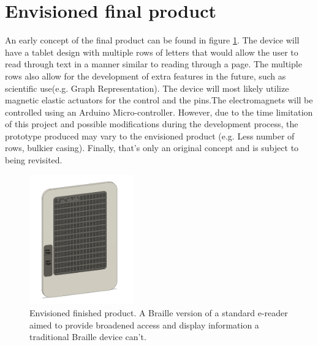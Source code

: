 \section{Envisioned final product}
An early concept of the final product can be found in figure \ref{fig:e-reader}.
The device will have a tablet design with multiple rows of letters that would allow the user to read through text in a manner similar to reading through a page.
The multiple rows also allow for the development of extra features in the future, such as scientific use(e.g. Graph Representation).
The device will most likely utilize magnetic elastic actuators for the control and the pins.The electromagnets will be controlled using an Arduino Micro-controller.
However, due to the time limitation of this project and possible modifications during the development process, the prototype produced may vary to the envisioned product (e.g. Less number of rows, bulkier casing).
Finally, that's only an original concept and is subject to being revisited.

\begin{figure}[h]
\centering
    \includegraphics[width=0.4\textwidth]{figures/e-reader.png}
\caption[Envisioned finished product]{Envisioned finished product. A Braille version of a standard e-reader aimed to provide broadened access and display information a traditional Braille device can't.}
\label{fig:e-reader}
\end{figure}

